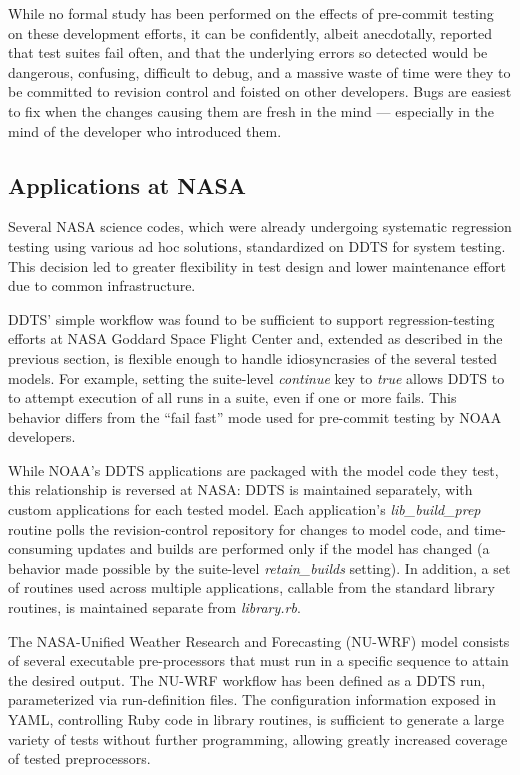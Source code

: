 \documentclass[conference]{IEEEtran}
\begin{document}
While no formal study has been performed on the effects of pre-commit testing on these development efforts, it can be confidently, albeit anecdotally, reported that test suites fail often, and that the underlying errors so detected would be dangerous, confusing, difficult to debug, and a massive waste of time were they to be committed to revision control and foisted on other developers. Bugs are easiest to fix when the changes causing them are fresh in the mind --- especially in the mind of the developer who introduced them.

\subsection{Applications at NASA}

Several NASA science codes, which were already undergoing systematic regression testing using various ad hoc solutions, standardized on DDTS for system testing. This decision led to greater flexibility in test design and lower maintenance effort due to common infrastructure.

DDTS' simple workflow was found to be sufficient to support regression-testing efforts at NASA Goddard Space Flight Center and, extended as described in the previous section, is flexible enough to handle idiosyncrasies of the several tested models. For example, setting the suite-level \emph{continue} key to \emph{true} allows DDTS to to attempt execution of all runs in a suite, even if one or more fails. This behavior differs from the ``fail fast'' mode used for pre-commit testing by NOAA developers.

While NOAA's DDTS applications are packaged with the model code they test, this relationship is reversed at NASA: DDTS is maintained separately, with custom applications for each tested model. Each application's \emph{lib\_build\_prep} routine polls the revision-control repository for changes to model code, and time-consuming updates and builds are performed only if the model has changed (a behavior made possible by the suite-level \emph{retain\_builds} setting). In addition, a set of routines used across multiple applications, callable from the standard library routines, is maintained separate from \emph{library.rb}.

The NASA-Unified Weather Research and Forecasting (NU-WRF) \cite{nuwrf} model consists of several executable pre-processors that must run in a specific sequence to attain the desired output. The NU-WRF workflow has been defined as a DDTS run, parameterized via run-definition files. The configuration information exposed in YAML, controlling Ruby code in library routines, is sufficient to generate a large variety of tests without further programming, allowing greatly increased coverage of tested preprocessors.
\end{document}

